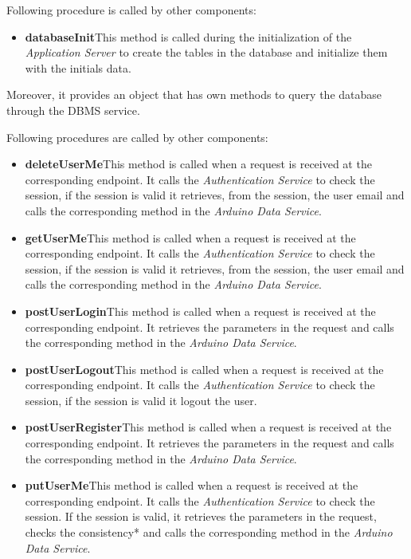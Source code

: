Following procedure is called by other components:
\begin{itemize}
    \item \textbf{databaseInit}\quad This method is called during the initialization of the \textit{Application Server} to create the tables in the database and initialize them with the initials data.
\end{itemize}

Moreover, it provides an object that has own methods to query the database through the DBMS service.

Following procedures are called by other components:
\begin{itemize}
    \item \textbf{deleteUserMe}\quad This method is called when a request is received at the corresponding endpoint. It calls the \textit{Authentication Service} to check the session, if the session is valid it retrieves, from the session, the user email and calls the corresponding method in the \textit{Arduino Data Service}.
    \item \textbf{getUserMe}\quad This method is called when a request is received at the corresponding endpoint. It calls the \textit{Authentication Service} to check the session, if the session is valid it retrieves, from the session, the user email and calls the corresponding method in the \textit{Arduino Data Service}.
    \item \textbf{postUserLogin}\quad This method is called when a request is received at the corresponding endpoint. It retrieves the parameters in the request and calls the corresponding method in the \textit{Arduino Data Service}.
    \item \textbf{postUserLogout}\quad This method is called when a request is received at the corresponding endpoint. It calls the \textit{Authentication Service} to check the session, if the session is valid it logout the user.
    \item \textbf{postUserRegister}\quad This method is called when a request is received at the corresponding endpoint. It retrieves the parameters in the request and calls the corresponding method in the \textit{Arduino Data Service}.
    \item \textbf{putUserMe}\quad This method is called when a request is received at the corresponding endpoint. It calls the \textit{Authentication Service} to check the session. If the session is valid, it retrieves the parameters in the request, checks the consistency* and calls the corresponding method in the \textit{Arduino Data Service}.
\end{itemize}

